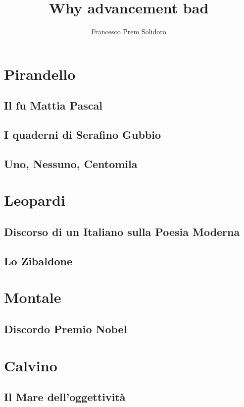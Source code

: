\documentclass{article}
\title{Why advancement bad}
\author{Francesco Prem Solidoro}
\begin{document}
\maketitle
\section{Pirandello} %
\label{sec:Pirandello}
\subsection{Il fu Mattia Pascal} %
\label{sub:Il fu Mattia Pascal}
\subsection{I quaderni di Serafino Gubbio} %
\label{sub:I quaderni di Serafino Gubbio}
\subsection{Uno, Nessuno, Centomila} %
\label{sub:Uno Nessuno Centomila}


\section{Leopardi} %
\label{sec:Leopardi}
\subsection{Discorso di un Italiano sulla Poesia Moderna} %
\label{sub:Discorso di un Italiano sulla Poesia Moderna}
\subsection{Lo Zibaldone} %
\label{sub:Lo Zibaldone}


\section{Montale} %
\label{sec:Montale}
\subsection{Discordo Premio Nobel} %
\label{sub:Discordo Premio Nobel}


\section{Calvino} %
\label{sec:Calvino}
\subsection{Il Mare dell'oggettività} %
\label{sub:Il Mare dell'oggettività}


\end{document}
